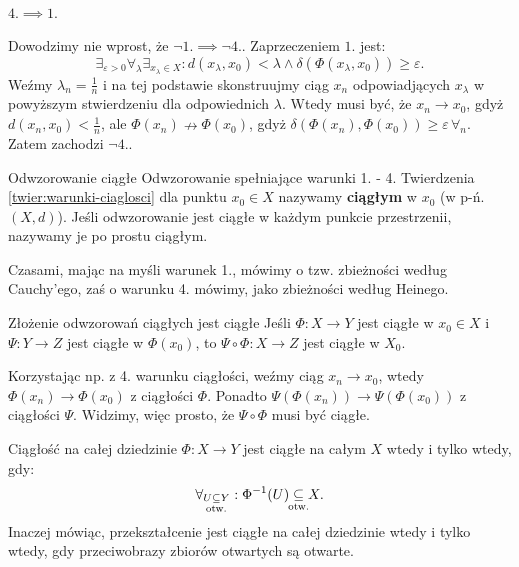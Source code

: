 \documentclass{article}
\numberwithin{defi}{section}
\numberwithin{defi}{section}
\newcommand{\subotw}{\underset{\clap{\scriptsize otw.}}{\subseteq}}
\providecommand{\eps}{\varepsilon}
\begin{document}
\begin{dow}
    \paragraph{$4. \implies 1.$} Dowodzimy nie wprost, że $\neg 1. \implies \neg 4.$. Zaprzeczeniem $1.$ jest: \begin{equation*}
        \exists_{\eps > 0} \forall_\lambda \exists_{x_\lambda \in X}: d(x_\lambda, x_0) < \lambda \wedge \delta( \Phi(x_\lambda, x_0)) \geqslant \eps.
    \end{equation*} Weźmy $\lambda_n = \frac{1}{n}$ i na tej podstawie skonstruujmy ciąg $x_n$ odpowiadjących $x_\lambda$ w powyższym stwierdzeniu dla odpowiednich $\lambda$. Wtedy musi być, że $x_n \to x_0$, gdyż $d(x_n, x_0) < \frac{1}{n}$, ale $\Phi(x_n) \nrightarrow \Phi(x_0)$, gdyż $\delta( \Phi(x_n), \Phi(x_0)) \geqslant \eps \, \forall_n$. Zatem zachodzi $\neg 4.$.

\end{dow}


    \begin{defr}{Odwzorowanie ciągłe}\label{defr:ciaglosc}
        Odwzorowanie spełniające warunki 1. - 4. Twierdzenia \ref{twier:warunki-ciaglosci} dla punktu $x_0 \in X$ nazywamy \textbf{ciągłym} w $x_0$ (w p-ń. $(X, d)$). Jeśli odwzorowanie jest ciągłe w każdym punkcie przestrzenii, nazywamy je po prostu ciągłym.
    \end{defr}
        Czasami, mając na myśli warunek 1., mówimy o tzw. zbieżności według Cauchy'ego, zaś o warunku 4. mówimy, jako zbieżności według Heinego.

    \begin{twier}{Złożenie odwzorowań ciągłych jest ciągłe}
        Jeśli $\Phi: X \to Y$ jest ciągłe w $x_0 \in X$ i $\Psi: Y \to Z$ jest ciągłe w $\Phi(x_0)$, to $\Psi \circ \Phi: X \to Z$ jest ciągłe w $X_0$.
    \end{twier}

    \begin{dow}
        Korzystając np. z 4. warunku ciągłości, weźmy ciąg $x_n \to x_0$, wtedy $\Phi(x_n) \to \Phi(x_0)$ z ciągłości $\Phi$. Ponadto $\Psi(\Phi(x_n)) \to \Psi(\Phi(x_0))$ z ciągłości $\Psi$. Widzimy, więc prosto, że $\Psi \circ \Phi$ musi być ciągłe.
    \end{dow}

    \begin{twier}{Ciągłość na całej dziedzinie}
        $\Phi: X \to Y$ jest ciągłe na całym $X$ wtedy i tylko wtedy, gdy: \begin{equation}
            \forall_{U \subotw Y}: \Phi^{-1}(U) \subotw X.
        \end{equation} Inaczej mówiąc, przekształcenie jest ciągłe na całej dziedzinie wtedy i tylko wtedy, gdy przeciwobrazy zbiorów otwartych są otwarte.
    \end{twier}
\end{document}

